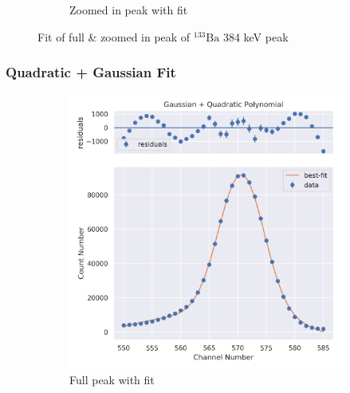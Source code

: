 \documentclass[11pt,a4paper]{article}
\newcommand{\element}[2]{$^{#2}\textrm{#1}$}
\begin{document}
\begin{figure}[H]
\begin{subfigure}{.5\linewidth}
    \caption{Zoomed in peak with fit}
  \end{subfigure}
  \caption{Fit of full \& zoomed in peak of \element{Ba}{133} 384 keV peak}
\end{figure}
\clearpage
\subsubsection{Quadratic + Gaussian Fit}
\begin{figure}[H]
  \centering
  \begin{subfigure}{.5\linewidth}
    \centering
    \includegraphics[width=\linewidth]{./Images/Barium133/Quad/Quad_1_Full.png}
    \caption{Full peak with fit}
  \end{subfigure}%
  \begin{subfigure}{.5\linewidth}
    \centering

\end{subfigure}
\end{figure}
\end{document}
